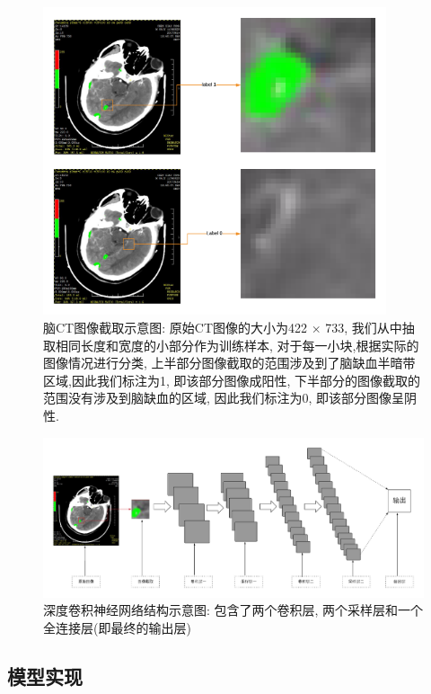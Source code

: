 \documentclass[12pt]{article}
\begin{document}
\begin{CJK*}{UTF8}{gbsn}
\begin{figure}[H]
\centering
\includegraphics[width=0.9\textwidth]{slice.png}
\caption{脑CT图像截取示意图: 原始CT图像的大小为422 $\times$ 733, 我们从中抽取相同长度和宽度的小部分作为训练样本, 对于每一小块,根据实际的图像情况进行分类, 上半部分图像截取的范围涉及到了脑缺血半暗带区域,因此我们标注为1, 即该部分图像成阳性, 下半部分的图像截取的范围没有涉及到脑缺血的区域, 因此我们标注为0, 即该部分图像呈阴性.}
\label{fig:fig1}
\end{figure}


\begin{figure}[H]
\centering
\includegraphics[width=1\textwidth]{cnn_struc2.png}
\caption{深度卷积神经网络结构示意图: 包含了两个卷积层, 两个采样层和一个全连接层(即最终的输出层)}
\label{fig:fig1}
\end{figure}

\subsection{模型实现}


\end{CJK*}
\end{document}
